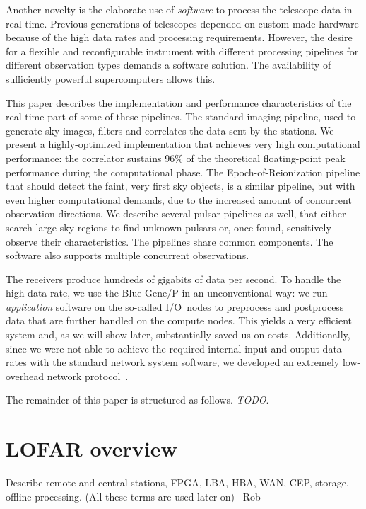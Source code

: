 \documentclass[conference]{IEEEtran}
\begin{document}
Another novelty is the elaborate use of \emph{software\/} to process
the telescope data in real time.
Previous generations of telescopes depended on custom-made hardware
because of the high data rates and processing requirements.
However, the desire for a flexible and reconfigurable instrument with
different processing pipelines for different observation types demands a
software solution.
The availability of sufficiently powerful supercomputers allows this.

This paper describes the implementation and performance characteristics of
the real-time part of some of these pipelines.
The standard imaging pipeline, used to generate sky images,
filters and correlates the data sent by the stations.
We present a highly-optimized implementation that achieves very high
computational performance: the correlator sustains 96\% of the theoretical
floating-point peak performance during the computational phase.
The Epoch-of-Reionization pipeline that should detect the faint, very first
sky objects, is a similar pipeline, but with even higher computational
demands, due to the increased amount of concurrent observation directions.
We describe several pulsar pipelines as well, that either search large sky
regions to find unknown pulsars or, once found, sensitively observe their
characteristics.
The pipelines share common components.
The software also supports multiple concurrent observations. %

The receivers produce hundreds of gigabits of data per second.
To handle the high data rate,
we use the Blue Gene/P in an unconventional way: we run \emph{application\/}
software on the so-called I/O~nodes to preprocess and postprocess data that are
further handled on the compute nodes.
This yields a very efficient system and, as we will show later, substantially
saved us on costs. %
Additionally, since we were not able to achieve the required internal input and output data
rates with the standard network system software, we developed an extremely
low-overhead network protocol~\cite{Romein:09a}.

The remainder of this paper is structured as follows.
\emph{TODO}.


\section{LOFAR overview}
Describe remote and central stations, FPGA, LBA, HBA, WAN, CEP, storage, offline processing.
(All these terms are used later on) --Rob
\end{document}
